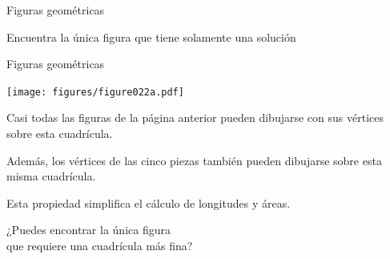 \documentclass[14pt,aspectratio=169,usenames,dvipsnames]{beamer}
\begin{document}
\begin{frame}{Figuras geométricas}
\begin{center}
            \smallskip

            {\small Encuentra la única figura que tiene solamente una solución}
        \end{center}
    \end{frame}


    \begin{frame}{Figuras geométricas}
        \begin{center}
            \begin{minipage}{0.5\textwidth}%
                \centering \texttt{[image: figures/figure022a.pdf]}
            \end{minipage}\hfill\begin{minipage}{0.49\textwidth} \small
                Casi todas las figuras de la página anterior pueden dibujarse con sus vértices sobre esta cuadrícula.

                \bigskip

                Además, los vértices de las cinco piezas también pueden dibujarse sobre esta misma cuadrícula.

                \bigskip

                Esta propiedad simplifica el cálculo de longitudes y áreas.
            \end{minipage}

            \bigskip \bigskip

            ¿Puedes encontrar la única figura\\que requiere una cuadrícula más fina?
        \end{center}

    \end{frame}

\end{document}
